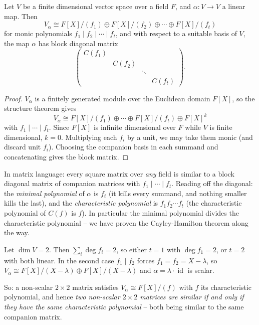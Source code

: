 \begin{theorem}
	Let $V$ be a finite dimensional vector space over a field $F$, and $\alpha: V \rightarrow V$ a linear map. Then
	$$
	V_{\alpha} \cong F[X]/(f_1) \oplus F[X]/(f_2) \oplus \cdots \oplus F[X]/(f_t)
	$$
	for monic polynomials $f_1 \mid f_2 \mid \cdots \mid f_t$, and with respect to a suitable basis of $V$, the map $\alpha$ has block diagonal matrix
	$$
	\begin{pmatrix}
		C(f_1) & & & \\
		& C(f_2) & & \\
		& & \ddots & \\
		& & & C(f_t)
	\end{pmatrix}.
	$$
\end{theorem}
\begin{proof}
	$V_{\alpha}$ is a finitely generated module over the Euclidean domain $F[X]$, so the structure theorem gives
	$$
	V_\alpha \cong F[X]/(f_1) \oplus \cdots \oplus F[X]/(f_t) \oplus F[X]^k
	$$
	with $f_1 \mid \cdots \mid f_t$. Since $F[X]$ is infinite dimensional over $F$ while $V$ is finite dimensional, $k = 0$. Multiplying each $f_i$ by a unit, we may take them monic (and discard unit $f_i$). Choosing the companion basis in each summand and concatenating gives the block matrix.
\end{proof}

\begin{remark}
	In matrix language: every square matrix over \emph{any} field is similar to a block diagonal matrix of companion matrices with $f_1 \mid \cdots \mid f_t$. Reading off the diagonal: the \emph{minimal polynomial} of $\alpha$ is $f_t$ (it kills every summand, and nothing smaller kills the last), and the \emph{characteristic polynomial} is $f_1 f_2 \cdots f_t$ (the characteristic polynomial of $C(f)$ is $f$). In particular the minimal polynomial divides the characteristic polynomial -- we have proven the Cayley-Hamilton theorem along the way.
\end{remark}

\begin{example}
	Let $\dim V = 2$. Then $\sum_i \deg f_i = 2$, so either $t = 1$ with $\deg f_1 = 2$, or $t = 2$ with both linear. In the second case $f_1 \mid f_2$ forces $f_1 = f_2 = X - \lambda$, so $V_{\alpha} \cong F[X]/(X - \lambda) \oplus F[X]/(X - \lambda)$ and $\alpha = \lambda \cdot \operatorname{id}$ is scalar.

	So: a non-scalar $2 \times 2$ matrix satisfies $V_\alpha \cong F[X]/(f)$ with $f$ its characteristic polynomial, and hence \emph{two non-scalar $2\times 2$ matrices are similar if and only if they have the same characteristic polynomial} -- both being similar to the same companion matrix.
\end{example}

